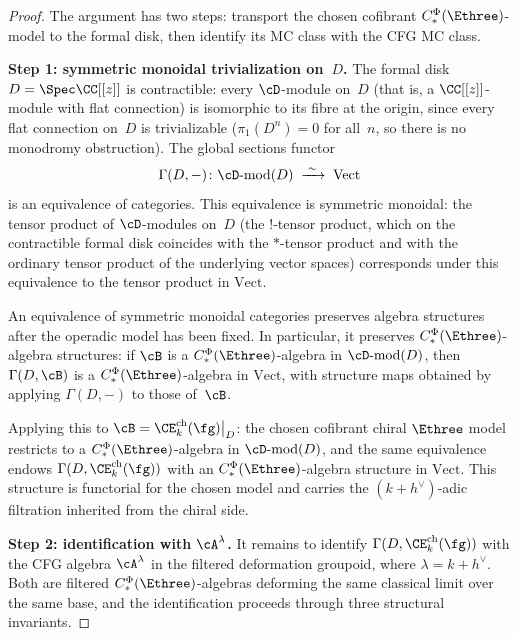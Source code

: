 \begin{proof}
The argument has two steps: transport the chosen cofibrant
$C_*^\Phi(\Ethree)$-model to the formal disk, then identify its MC
class with the CFG MC class.

\smallskip
\noindent\textbf{Step 1: symmetric monoidal trivialization
on~$D$.}
The formal disk $D = \Spec \CC[[z]]$ is contractible:
every $\cD$-module on~$D$ (that is, a $\CC[[z]]$-module
with flat connection) is isomorphic to its fibre at the
origin, since every flat connection on~$D$ is
trivializable ($\pi_1(D^n) = 0$ for all~$n$, so there is
no monodromy obstruction). The global sections functor
\begin{equation}\label{eq:disk-equivalence}
 \Gamma(D, -) \colon
 \cD\textrm{-}\mathrm{mod}(D) \;\xrightarrow{\;\sim\;}\;
 \mathrm{Vect}
\end{equation}
is an equivalence of categories. This equivalence is
symmetric monoidal: the tensor product of $\cD$-modules
on~$D$ (the $!$-tensor product, which on the contractible
formal disk coincides with the $*$-tensor product and with
the ordinary tensor product of the underlying vector
spaces) corresponds under this equivalence to
the tensor product in $\mathrm{Vect}$.

An equivalence of symmetric monoidal categories preserves algebra
structures after the operadic model has been fixed. In particular,
it preserves $C_*^\Phi(\Ethree)$-algebra structures: if $\cB$ is a
$C_*^\Phi(\Ethree)$-algebra in
$\cD\textrm{-}\mathrm{mod}(D)$, then
$\Gamma(D, \cB)$ is a $C_*^\Phi(\Ethree)$-algebra in
$\mathrm{Vect}$, with structure maps obtained by applying
$\Gamma(D, -)$ to those of~$\cB$.

Applying this to
$\cB = \CE^{\mathrm{ch}}_k(\fg)\big|_D$: the chosen cofibrant
chiral $\Ethree$ model restricts to a
$C_*^\Phi(\Ethree)$-algebra in $\cD\textrm{-}\mathrm{mod}(D)$, and
the same equivalence endows
$\Gamma(D, \CE^{\mathrm{ch}}_k(\fg))$ with an
$C_*^\Phi(\Ethree)$-algebra structure in $\mathrm{Vect}$. This
structure is functorial for the chosen model and carries the
$(k+h^\vee)$-adic filtration inherited from the chiral side.

\smallskip
\noindent\textbf{Step 2: identification with $\cA^\lambda$.}
It remains to identify
$\Gamma(D, \CE^{\mathrm{ch}}_k(\fg))$ with the CFG
algebra $\cA^\lambda$ in the filtered deformation groupoid,
where $\lambda = k + h^\vee$. Both are filtered
$C_*^\Phi(\Ethree)$-algebras deforming the same classical limit over
the same base, and the identification proceeds through
three structural invariants.


\end{proof}
